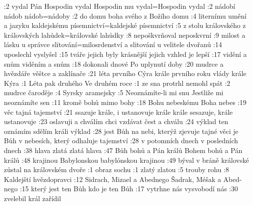 :2  {vydal Pán} {} {Hospodin vydal} {Hospodin mu vydal}={Hospodin vydal} {} {}
:2  {nádobí} {} {nádob} {nádob}={nádoby} {} {}
:2  {do domu boha svého} {} {} {z Božího domu} {} {}
:4  {liternímu umění a jazyku} {} {} {kaldejskému písemnictví}={kaldejské písemnictví} {} {}
:5  {z stolu královského} {} {} {z královských lahůdek}={královské lahůdky} {} {}
:8  {nepoškvrňoval} {} {} {neposkvrní} {} {}
:9  {milost a lásku u správce} {} {} {slitování}={milosrdenství a slitování u velitele dvořanů} {} {}
:14 {uposlechl} {} {} {vyslyšel} {} {}
:15 {tváře jejich byly krásnější} {} {} {jejich vzhled je lepší} {} {}
:17 {vidění a snům} {} {} {viděním a snům} {} {}
:18 {dokonali dnové} {} {} {Po uplynutí doby} {} {}
:20 {mudrce a hvězdáře} {} {} {věštce a zaklínače} {} {}
:21 {léta prvního Cýra krále} {} {} {prvního roku vlády krále Kýra} {} {}
:1  {Léta pak druhého} {} {} {Ve druhém roce} {} {}
:1  {ze sna protrhl} {} {} {nemohl spát} {} {}
:2  {mudrce} {} {} {čaroděje} {} {}
:4  {Syrsky} {} {} {aramejsky} {} {}
:5  {Neoznámíte-li mi snu} {} {} {Jestliže mi neoznámíte sen} {} {}
:11 {kromě bohů} {} {} {mimo bohy} {} {}
:18 {Bohu nebeskému} {} {} {Boha nebes} {} {}
:19 {věc tajná} {} {} {tajemství} {} {}
:21 {ssazuje krále, i ustanovuje krále} {} {} {krále sesazuje, krále ustanovuje} {} {}
:23 {oslavuji a chválím} {} {} {chci vzdávat čest a chválu} {} {}
:24 {výklad ten oznámím} {} {} {sdělím králi výklad} {} {}
:28 {jest Bůh na nebi, kterýž zjevuje tajné věci} {} {} {je Bůh v nebesích, který odhaluje tajemství} {} {}
:28 {v potomních dnech} {} {} {v posledních dnech} {} {}
:38 {hlava zlatá} {} {} {zlatá hlava} {} {}
:47 {Bůh bohů a Pán králů} {} {} {Bohem bohů a Pán králů} {} {}
:48 {krajinou Babylonskou} {} {} {babylónskou krajinou} {} {}
:49 {býval v bráně královské} {} {} {zůstal na královském dvoře} {} {}
:1  {obraz} {} {} {sochu} {} {}
:1  {zlatý} {} {} {zlatou} {} {}
:5  {trouby} {} {} {rohu} {} {}
:8  {Kaldejští} {} {} {hvězdopravci} {} {}
:12 {Sidrach, Mizael a Abednego} {} {} {Šadrak, Méšak a Abed-nego} {} {}
:15 {který jest ten Bůh} {} {} {kdo je ten Bůh} {} {}
:17 {vytrhne nás} {} {} {vysvobodí nás} {} {}
:30 {zvelebil} {} {} {král zařídil} {} {}
